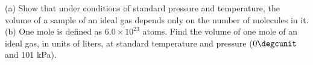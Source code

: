 (a) Show that under conditions of standard pressure and
temperature, the volume of a sample of an ideal gas depends
only on the number of molecules in it.\hwendpart
(b) One mole is
defined as $6.0\times10^{23}$ atoms. Find the volume of one mole
of an ideal gas, in units of liters, at standard temperature
and pressure ($0\degcunit$  and 101 kPa). \answercheck
